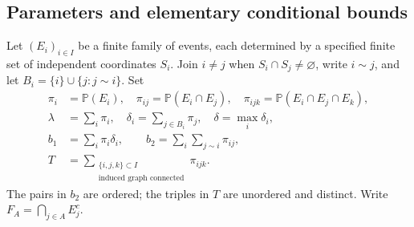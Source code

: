 \documentclass[11pt]{article}
\theoremstyle{definition}\newtheorem{definition}[theorem]{Definition}
\theoremstyle{remark}\newtheorem{remark}[theorem]{Remark}
\newcommand{\PP}{\mathbb P}
\newcommand{\la}{\lambda}
\begin{document}
\subsection{Parameters and elementary conditional bounds}
Let $(E_i)_{i\in I}$ be a finite family of events, each determined by a
specified finite set of independent coordinates $S_i$. Join $i\ne j$
when $S_i\cap S_j\ne\varnothing$, write $i\sim j$, and let
$B_i=\{i\}\cup\{j:j\sim i\}$. Set
\begin{align}
 \pi_i&=\PP(E_i),\quad \pi_{ij}=\PP(E_i\cap E_j),\quad
 \pi_{ijk}=\PP(E_i\cap E_j\cap E_k),\nonumber\\
 \la&=\sum_i\pi_i,\quad
 \delta_i=\sum_{j\in B_i}\pi_j,\quad \delta=\max_i\delta_i,\nonumber\\
 b_1&=\sum_i\pi_i\delta_i,\qquad
 b_2=\sum_i\sum_{j\sim i}\pi_{ij},\label{eq:localpars}\\
 T&=\sum_{\substack{\{i,j,k\}\subset I\\
                 \text{induced graph connected}}}\pi_{ijk}.
 \label{eq:Tdef}
\end{align}
The pairs in $b_2$ are ordered; the triples in $T$ are unordered and
distinct. Write $F_A=\bigcap_{j\in A}E_j^c$.
\end{document}

